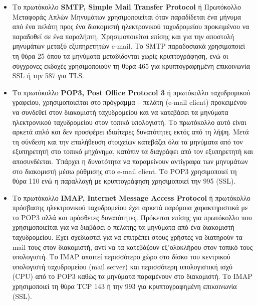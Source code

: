 \begin{itemize}
\item Το πρωτόκολλο \textbf{SMTP, Simple Mail Transfer Protocol} ή Πρωτόκολλο Μεταφοράς Απλών Μηνυμάτων χρησιμοποιείται όταν παραδίδεται ένα μήνυμα από ένα πελάτη προς ένα διακομιστή ηλεκτρονικού ταχυδρομείου προκειμένου να παραδοθεί σε ένα παραλήπτη. Χρησιμοποιείται επίσης και για την αποστολή μηνυμάτων μεταξύ εξυπηρετητών e-mail. Το SMTP παραδοσιακά χρησιμοποιεί τη θύρα 25 όπου τα μηνύματα μεταδίδονται χωρίς κρυπτογράφηση, ενώ οι σύγχρονες εκδοχές χρησιμοποιούν τη θύρα 465 για κρυπτογραφημένη επικοινωνία SSL ή την 587 για TLS.
\item Το πρωτόκολλο \textbf{POP3, Post Office Protocol 3} ή πρωτόκολλο ταχυδρομικού γραφείου, χρησιμοποιείται στο πρόγραμμα -- πελάτη (e-mail client) προκειμένου να συνδεθεί στον διακομιστή ταχυδρομείου και να κατεβάσει τα μηνύματα ηλεκτρονικού ταχυδρομείου στον τοπικό υπολογιστή. Το πρωτόκολλο αυτό είναι αρκετά απλό και δεν προσφέρει ιδιαίτερες δυνατότητες εκτός από τη λήψη. Μετά τη σύνδεση και την επαλήθευση στοιχείων κατεβάζει όλα τα μηνύματα από τον εξυπηρετητή στο τοπικό μηχάνημα, κατόπιν τα διαγράφει από τον εξυπηρετητή και αποσυνδέεται. Υπάρχει η δυνατότητα να παραμείνουν αντίγραφα των μηνυμάτων στο διακομιστή μέσω ρύθμισης στο e-mail client. Το POP3 χρησιμοποιεί τη θύρα 110 ενώ η παραλλαγή με κρυπτογράφηση χρησιμοποιεί την 995 (SSL).
\item Το πρωτόκολλο \textbf{IMAP, Internet Message Access Protocol} ή πρωτόκολλο πρόσβασης ηλεκτρονικού ταχυδρομείου έχει αρκετά παρόμοια χαρακτηριστικά με το POP3 αλλά και πρόσθετες δυνατότητες. Πρόκειται επίσης για πρωτόκολλο που χρησιμοποιείται για να διαβάσει ο πελάτης τα μηνύματα από ένα διακομιστή ταχυδρομείου. Έχει σχεδιαστεί για να επιτρέπει στους χρήστες να διατηρούν τα mail τους στον διακομιστή, αντί να τα κατεβάζουν εξ'ολοκλήρου στον τοπικό τους υπολογιστή. Το IMAP απαιτεί περισσότερο χώρο στο δίσκο του κεντρικού υπολογιστή ταχυδρομείου (mail server) και περισσότερη υπολογιστική ισχύ (CPU) από το POP3 καθώς τα μηνύματα παραμένουν στο διακομιστή. Το IMAP χρησιμοποιεί τη θύρα TCP 143 ή την 993 για κρυπτογραφημένη επικοινωνία (SSL).
\end{itemize}

